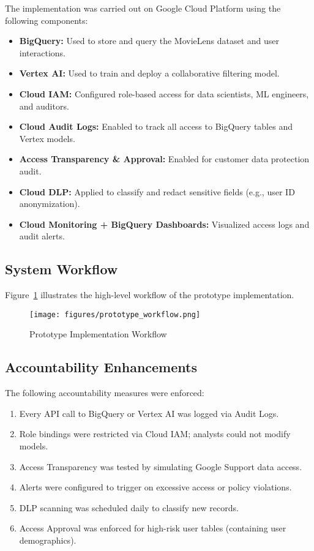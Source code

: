 \documentclass[acmsmall]{acmart}
\begin{document}
The implementation was carried out on Google Cloud Platform using the following components:

\begin{itemize}
    \item \textbf{BigQuery:} Used to store and query the MovieLens dataset and user interactions.
    \item \textbf{Vertex AI:} Used to train and deploy a collaborative filtering model.
    \item \textbf{Cloud IAM:} Configured role-based access for data scientists, ML engineers, and auditors.
    \item \textbf{Cloud Audit Logs:} Enabled to track all access to BigQuery tables and Vertex models.
    \item \textbf{Access Transparency \& Approval:} Enabled for customer data protection audit.
    \item \textbf{Cloud DLP:} Applied to classify and redact sensitive fields (e.g., user ID anonymization).
    \item \textbf{Cloud Monitoring + BigQuery Dashboards:} Visualized access logs and audit alerts.
\end{itemize}

\subsection{System Workflow}

Figure~\ref{fig:prototype_workflow} illustrates the high-level workflow of the prototype implementation.

\begin{figure}[h]
    \centering
    \texttt{[image: figures/prototype\_workflow.png]}
    \caption{Prototype Implementation Workflow}
    \label{fig:prototype_workflow}
\end{figure}

\subsection{Accountability Enhancements}

The following accountability measures were enforced:

\begin{enumerate}
    \item Every API call to BigQuery or Vertex AI was logged via Audit Logs.
    \item Role bindings were restricted via Cloud IAM; analysts could not modify models.
    \item Access Transparency was tested by simulating Google Support data access.
    \item Alerts were configured to trigger on excessive access or policy violations.
    \item DLP scanning was scheduled daily to classify new records.
    \item Access Approval was enforced for high-risk user tables (containing user demographics).
\end{enumerate}
\end{document}
